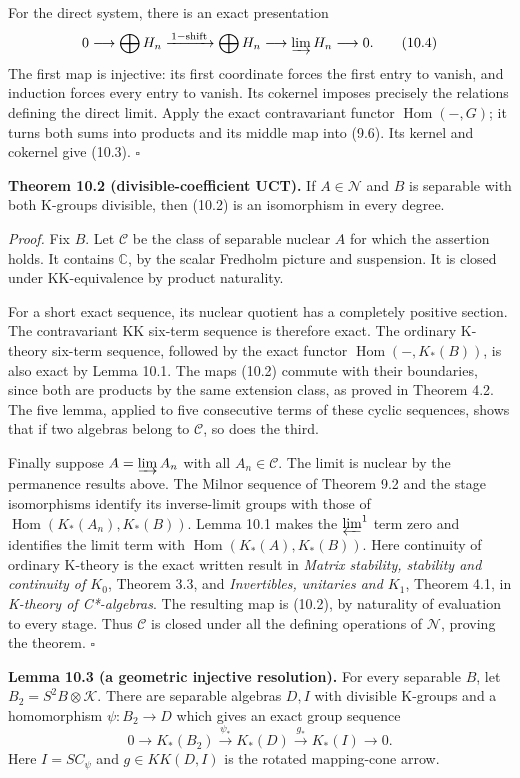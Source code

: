 \documentclass[
  11pt,
]{article}
\begin{document}
For the direct system, there is an exact presentation \[
0\longrightarrow\bigoplus H_n
\xrightarrow{\,1-\text{shift}\,}\bigoplus H_n
\longrightarrow\varinjlim H_n\longrightarrow0.
\tag{10.4}
\] The first map is injective: its first coordinate forces the first
entry to vanish, and induction forces every entry to vanish. Its
cokernel imposes precisely the relations defining the direct limit.
Apply the exact contravariant functor \(\operatorname{Hom}(-,G)\); it
turns both sums into products and its middle map into (9.6). Its kernel
and cokernel give (10.3). \(\square\)

\textbf{Theorem 10.2 (divisible-coefficient UCT).} If \(A\in\mathcal N\)
and \(B\) is separable with both K-groups divisible, then (10.2) is an
isomorphism in every degree.

\emph{Proof.} Fix \(B\). Let \(\mathcal C\) be the class of separable
nuclear \(A\) for which the assertion holds. It contains \(\mathbb C\),
by the scalar Fredholm picture and suspension. It is closed under
KK-equivalence by product naturality.

For a short exact sequence, its nuclear quotient has a completely
positive section. The contravariant KK six-term sequence is therefore
exact. The ordinary K-theory six-term sequence, followed by the exact
functor \(\operatorname{Hom}(-,K_*(B))\), is also exact by Lemma 10.1.
The maps (10.2) commute with their boundaries, since both are products
by the same extension class, as proved in Theorem 4.2. The five lemma,
applied to five consecutive terms of these cyclic sequences, shows that
if two algebras belong to \(\mathcal C\), so does the third.

Finally suppose \(A=\varinjlim A_n\) with all \(A_n\in\mathcal C\). The
limit is nuclear by the permanence results above. The Milnor sequence of
Theorem 9.2 and the stage isomorphisms identify its inverse-limit groups
with those of \(\operatorname{Hom}(K_*(A_n),K_*(B))\). Lemma 10.1 makes
the \(\varprojlim^1\) term zero and identifies the limit term with
\(\operatorname{Hom}(K_*(A),K_*(B))\). Here continuity of ordinary
K-theory is the exact written result in \emph{Matrix stability,
stability and continuity of \(K_0\)}, Theorem 3.3, and
\emph{Invertibles, unitaries and \(K_1\)}, Theorem 4.1, in
\emph{K-theory of C*-algebras}. The resulting map is (10.2), by
naturality of evaluation to every stage. Thus \(\mathcal C\) is closed
under all the defining operations of \(\mathcal N\), proving the
theorem. \(\square\)

\textbf{Lemma 10.3 (a geometric injective resolution).} For every
separable \(B\), let \(B_2=S^2B\otimes\mathcal K\). There are separable
algebras \(D,I\) with divisible K-groups and a homomorphism
\(\psi:B_2\to D\) which gives an exact group sequence \[
0\longrightarrow K_*(B_2)\xrightarrow{\psi_*}K_*(D)
\xrightarrow{g_*}K_*(I)\longrightarrow0.
\tag{10.5}
\] Here \(I=SC_\psi\) and \(g\in KK(D,I)\) is the rotated mapping-cone
arrow.
\end{document}
